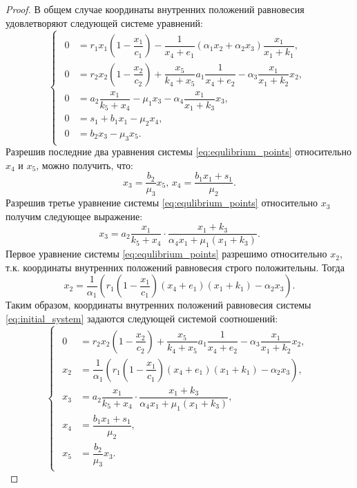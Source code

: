 \documentclass[14pt,a4paper]{extarticle}
\begin{document}
	\begin{proof}
		В общем случае координаты внутренних положений равновесия удовлетворяют следующей системе уравнений:
		\begin{equation}\label{eq:equlibrium_points}
			\begin{cases}
				\begin{aligned}
					0 &= r_1x_1\left(1-\dfrac{x_1}{c_1}\right)-\dfrac{1}{x_4+e_1}(\alpha_1x_2+\alpha_2x_3)\dfrac{x_1}{x_1+k_1},\\
					0 &= r_2x_2\left(1-\dfrac{x_2}{c_2}\right)+\dfrac{x_5}{k_4+x_5}a_1\dfrac{1}{x_4+e_2}-\alpha_3\dfrac{x_1}{x_1+k_2}x_2,\\
					0 &= a_2\dfrac{x_1}{k_5+x_4}-\mu_1x_3-\alpha_4\dfrac{x_1}{x_1+k_3}x_3,\\
					0 &= s_1 + b_1x_1-\mu_2x_4,\\
					0 &= b_2x_3-\mu_3x_5.
				\end{aligned}
			\end{cases}
		\end{equation}
		Разрешив последние два уравнения системы \ref{eq:equlibrium_points} относительно $x_4$ и $x_5$, можно получить, что: 
		\[x_3=\dfrac{b_2}{\mu_3}x_5,\, x_4=\dfrac{b_1x_1+s_1}{\mu_2}.\]
		Разрешив третье уравнение системы \ref{eq:equlibrium_points} относительно $x_3$ получим следующее выражение:
		\[x_3 = a_2\dfrac{x_1}{k_5+x_4}\cdot\dfrac{x_1+k_3}{\alpha_4x_1+\mu_1(x_1+k_3)}.\]
		Первое уравнение системы \ref{eq:equlibrium_points} разрешимо относительно $x_2$, т.к. координаты внутренних положений равновесия строго положительны. Тогда
		\[x_2 = \dfrac{1}{\alpha_1}\left(r_1\left(1-\dfrac{x_1}{c_1}\right)(x_4+e_1)(x_1+k_1)-\alpha_2x_3\right).\]
		Таким образом, координаты внутренних положений равновесия системы \ref{eq:initial_system} задаются следующей системой соотношений:
		\begin{equation}\label{eq:P3_equations}
			\begin{cases}
				\begin{aligned}
					0 &= r_2x_2\left(1-\dfrac{x_2}{c_2}\right)+\dfrac{x_5}{k_4+x_5}a_1\dfrac{1}{x_4+e_2}-\alpha_3\dfrac{x_1}{x_1+k_2}x_2,\\
					x_2 &= \dfrac{1}{\alpha_1}\left(r_1\left(1-\dfrac{x_1}{c_1}\right)(x_4+e_1)(x_1+k_1)-\alpha_2x_3\right),\\
					x_3 &= a_2\dfrac{x_1}{k_5+x_4}\cdot\dfrac{x_1+k_3}{\alpha_4x_1+\mu_1(x_1+k_3)},\\
					x_4 &= \dfrac{b_1x_1+s_1}{\mu_2},\\
					x_5 &= \dfrac{b_2}{\mu_3}x_3.

\end{aligned}
\end{cases}
\end{equation}
\end{proof}
\end{document}
